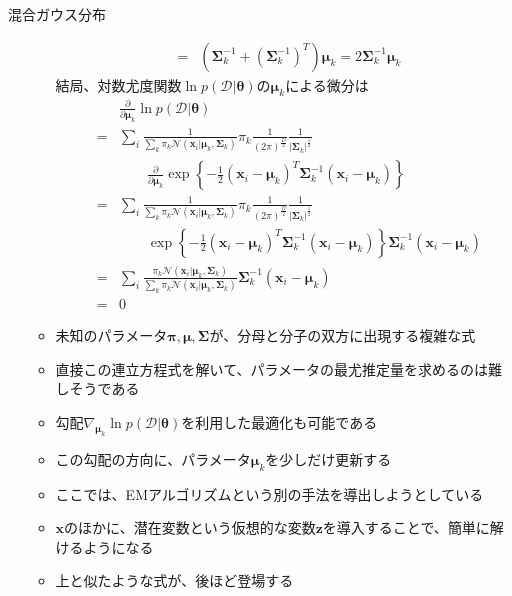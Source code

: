 \documentclass[dvipdfmx,notheorems,t]{beamer}
\begin{document}
\begin{frame}{混合ガウス分布}
\begin{itemize}
\begin{itemize}
\begin{eqnarray}
			&=& \left( \bm{\Sigma}_k^{-1} + \left( \bm{\Sigma}_k^{-1} \right)^T \right) \bm{\mu}_k = 2 \bm{\Sigma}_k^{-1} \bm{\mu}_k
		\end{eqnarray}
		結局、対数尤度関数$\ln p(\mathcal{D} | \bm{\theta})$の$\bm{\mu}_k$による微分は
		\begin{eqnarray}
			&& \frac{\partial}{\partial \bm{\mu}_k} \ln p(\mathcal{D} | \bm{\theta}) \nonumber \\
			&=& \sum_i \frac{1}{\sum_k \pi_k \mathcal{N}(\bm{x}_i | \bm{\mu}_k, \bm{\Sigma}_k)} \pi_k \frac{1}{(2\pi)^\frac{D}{2}} \frac{1}{|\bm{\Sigma}_k|^\frac{1}{2}} \nonumber \\
			&& \qquad \frac{\partial}{\partial \bm{\mu}_k} \exp \left\{ -\frac{1}{2} (\bm{x}_i - \bm{\mu}_k)^T \bm{\Sigma}_k^{-1} (\bm{x}_i - \bm{\mu}_k) \right\} \nonumber \\
			&=& \sum_i \frac{1}{\sum_k \pi_k \mathcal{N}(\bm{x}_i | \bm{\mu}_k, \bm{\Sigma}_k)} \pi_k \frac{1}{(2\pi)^\frac{D}{2}} \frac{1}{|\bm{\Sigma}_k|^\frac{1}{2}} \nonumber \\
			&& \qquad \exp \left\{ -\frac{1}{2} (\bm{x}_i - \bm{\mu}_k)^T \bm{\Sigma}_k^{-1} (\bm{x}_i - \bm{\mu}_k) \right\} \bm{\Sigma}_k^{-1} (\bm{x}_i - \bm{\mu}_k) \nonumber \\
			&=& \sum_i \frac{\pi_k \mathcal{N}(\bm{x}_i | \bm{\mu}_k, \bm{\Sigma}_k)}{\sum_k \pi_k \mathcal{N}(\bm{x}_i | \bm{\mu}_k, \bm{\Sigma}_k)} \bm{\Sigma}_k^{-1} (\bm{x}_i - \bm{\mu}_k) \\
			&=& 0 \nonumber
		\end{eqnarray}
		
		\item 未知のパラメータ$\bm{\pi}, \bm{\mu}, \bm{\Sigma}$が、分母と分子の双方に出現する複雑な式
		\item 直接この連立方程式を解いて、パラメータの最尤推定量を求めるのは難しそうである
		\newline
		\item 勾配$\nabla_{\bm{\mu}_k} \ln p(\mathcal{D} | \bm{\theta})$を利用した最適化も可能である
		\item この勾配の方向に、パラメータ$\bm{\mu}_k$を少しだけ更新する
		\item ここでは、\alert{EMアルゴリズム}という別の手法を導出しようとしている
		\newline
		\item $\bm{x}$のほかに、\alert{潜在変数}という仮想的な変数$\bm{z}$を導入することで、\alert{簡単に解けるようになる}
		\newline
		\item 上と似たような式が、後ほど登場する
	\end{itemize}
\end{itemize}

\end{frame}
\end{document}
